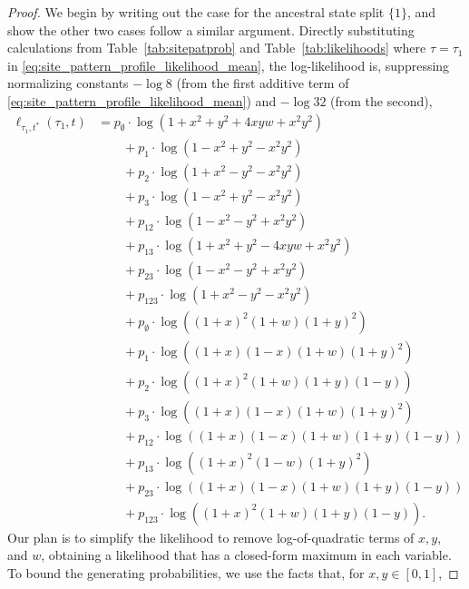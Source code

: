 \begin{proof}
We begin by writing out the case for the ancestral state split $\{1\}$, and show the other two cases follow a similar argument.
Directly substituting calculations from Table~\ref{tab:sitepatprob} and Table~\ref{tab:likelihoods} where $\tau = \tau_1$ in \eqref{eq:site_pattern_profile_likelihood_mean}, the log-likelihood is, suppressing normalizing constants $-\log 8$ (from the first additive term of \eqref{eq:site_pattern_profile_likelihood_mean}) and $-\log 32$ (from the second),
\begin{align}
    \label{eq:farris_likelihood}
    \ell_{\tau_1,t^*}(\tau_1, t)
    &=        p_{\emptyset}  \cdot\log(1+x^2+y^2+4xyw+x^2y^2) \nonumber \\
    &\qquad + p_{1}          \cdot\log(1-x^2+y^2-x^2y^2) \nonumber \\
    &\qquad + p_{2}          \cdot\log(1+x^2-y^2-x^2y^2) \nonumber \\
    &\qquad + p_{3}          \cdot\log(1-x^2+y^2-x^2y^2) \nonumber \\
    &\qquad + p_{12}         \cdot\log(1-x^2-y^2+x^2y^2) \nonumber \\
    &\qquad + p_{13}         \cdot\log(1+x^2+y^2-4xyw+x^2y^2) \nonumber \\
    &\qquad + p_{23}         \cdot\log(1-x^2-y^2+x^2y^2) \nonumber \\
    &\qquad + p_{123}        \cdot\log(1+x^2-y^2-x^2y^2) \nonumber \\
    &\qquad + p_{\emptyset}  \cdot\log((1+x)^2   (1+w)(1+y)^2) \nonumber \\
    &\qquad + p_{1}          \cdot\log((1+x)(1-x)(1+w)(1+y)^2) \nonumber \\
    &\qquad + p_{2}          \cdot\log((1+x)^2   (1+w)(1+y)(1-y)) \nonumber \\
    &\qquad + p_{3}          \cdot\log((1+x)(1-x)(1+w)(1+y)^2) \nonumber \\
    &\qquad + p_{12}         \cdot\log((1+x)(1-x)(1+w)(1+y)(1-y)) \nonumber \\
    &\qquad + p_{13}         \cdot\log((1+x)^2   (1-w)(1+y)^2) \nonumber \\
    &\qquad + p_{23}         \cdot\log((1+x)(1-x)(1+w)(1+y)(1-y)) \nonumber \\
    &\qquad + p_{123}        \cdot\log((1+x)^2   (1+w)(1+y)(1-y)).
\end{align}
Our plan is to simplify the likelihood to remove log-of-quadratic terms of $x,y,$ and $w$, obtaining a likelihood that has a closed-form maximum in each variable.
To bound the generating probabilities, we use the facts that, for $x,y\in[0,1]$,

\end{proof}
